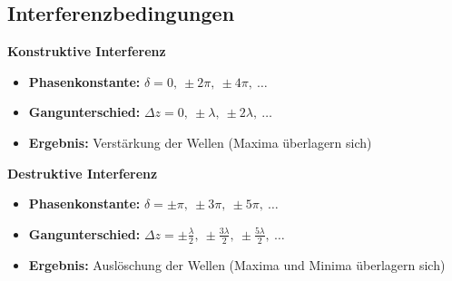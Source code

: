 \documentclass[a5paper,10pt]{article}
\begin{document}
\newpage
\subsection{Interferenzbedingungen}

\textbf{Konstruktive Interferenz}

\begin{itemize}
	\item \textbf{Phasenkonstante:} $\delta = 0,\ \pm 2\pi,\ \pm 4\pi,\ \dots$
	\item \textbf{Gangunterschied:} $\Delta z = 0,\ \pm \lambda,\ \pm 2\lambda,\ \dots$
	\item \textbf{Ergebnis:} Verstärkung der Wellen (Maxima überlagern sich)
\end{itemize}

\vspace{1ex}

\textbf{Destruktive Interferenz}

\begin{itemize}
	\item \textbf{Phasenkonstante:} $\delta = \pm \pi,\ \pm 3\pi,\ \pm 5\pi,\ \dots$
	\item \textbf{Gangunterschied:} $\Delta z = \pm \frac{\lambda}{2},\ \pm \frac{3\lambda}{2},\ \pm \frac{5\lambda}{2},\ \dots$
	\item \textbf{Ergebnis:} Auslöschung der Wellen (Maxima und Minima überlagern sich)
\end{itemize}
\end{document}
